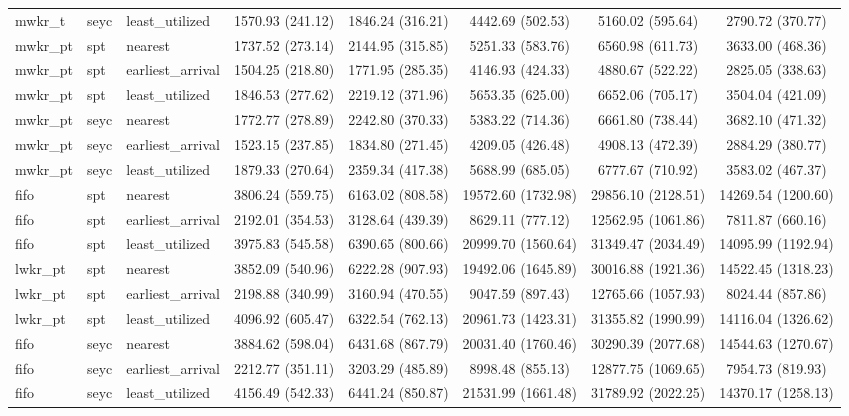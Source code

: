 \begin{table}[t]
\begin{tabular}{lllccccc}
mwkr\_t & seyc & least\_utilized & 1570.93 (241.12) & 1846.24 (316.21) & 4442.69 (502.53) & 5160.02 (595.64) & 2790.72 (370.77) \\
mwkr\_pt & spt & nearest & 1737.52 (273.14) & 2144.95 (315.85) & 5251.33 (583.76) & 6560.98 (611.73) & 3633.00 (468.36) \\
mwkr\_pt & spt & earliest\_arrival & 1504.25 (218.80) & 1771.95 (285.35) & 4146.93 (424.33) & 4880.67 (522.22) & 2825.05 (338.63) \\
mwkr\_pt & spt & least\_utilized & 1846.53 (277.62) & 2219.12 (371.96) & 5653.35 (625.00) & 6652.06 (705.17) & 3504.04 (421.09) \\
mwkr\_pt & seyc & nearest & 1772.77 (278.89) & 2242.80 (370.33) & 5383.22 (714.36) & 6661.80 (738.44) & 3682.10 (471.32) \\
mwkr\_pt & seyc & earliest\_arrival & 1523.15 (237.85) & 1834.80 (271.45) & 4209.05 (426.48) & 4908.13 (472.39) & 2884.29 (380.77) \\
mwkr\_pt & seyc & least\_utilized & 1879.33 (270.64) & 2359.34 (417.38) & 5688.99 (685.05) & 6777.67 (710.92) & 3583.02 (467.37) \\
fifo & spt & nearest & 3806.24 (559.75) & 6163.02 (808.58) & 19572.60 (1732.98) & 29856.10 (2128.51) & 14269.54 (1200.60) \\
fifo & spt & earliest\_arrival & 2192.01 (354.53) & 3128.64 (439.39) & 8629.11 (777.12) & 12562.95 (1061.86) & 7811.87 (660.16) \\
fifo & spt & least\_utilized & 3975.83 (545.58) & 6390.65 (800.66) & 20999.70 (1560.64) & 31349.47 (2034.49) & 14095.99 (1192.94) \\
lwkr\_pt & spt & nearest & 3852.09 (540.96) & 6222.28 (907.93) & 19492.06 (1645.89) & 30016.88 (1921.36) & 14522.45 (1318.23) \\
lwkr\_pt & spt & earliest\_arrival & 2198.88 (340.99) & 3160.94 (470.55) & 9047.59 (897.43) & 12765.66 (1057.93) & 8024.44 (857.86) \\
lwkr\_pt & spt & least\_utilized & 4096.92 (605.47) & 6322.54 (762.13) & 20961.73 (1423.31) & 31355.82 (1990.99) & 14116.04 (1326.62) \\
fifo & seyc & nearest & 3884.62 (598.04) & 6431.68 (867.79) & 20031.40 (1760.46) & 30290.39 (2077.68) & 14544.63 (1270.67) \\
fifo & seyc & earliest\_arrival & 2212.77 (351.11) & 3203.29 (485.89) & 8998.48 (855.13) & 12877.75 (1069.65) & 7954.73 (819.93) \\
fifo & seyc & least\_utilized & 4156.49 (542.33) & 6441.24 (850.87) & 21531.99 (1661.48) & 31789.92 (2022.25) & 14370.17 (1258.13) \\

\end{tabular}
\end{table}
